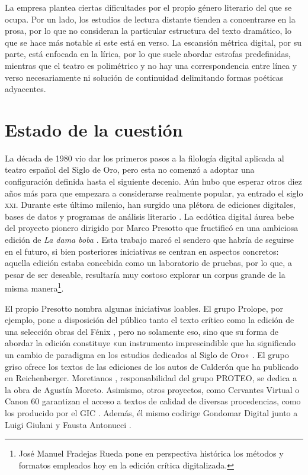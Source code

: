 La empresa plantea ciertas dificultades por el propio género literario del que se ocupa. Por un lado, los estudios de lectura distante tienden a concentrarse en la prosa, por lo que no consideran la particular estructura del texto dramático, lo que se hace más notable si este está en verso. La escansión métrica digital, por su parte, está enfocada en la lírica, por lo que suele abordar estrofas predefinidas, mientras que el teatro es polimétrico y no hay una correspondencia entre línea y verso necesariamente ni solución de continuidad delimitando formas poéticas adyacentes.

\section{Estado de la cuestión}
La década de 1980 vio dar los primeros pasos a la filología digital aplicada al teatro español del Siglo de Oro, pero esta no comenzó a adoptar una configuración definida hasta el siguiente decenio. Aún hubo que esperar otros diez años más para que empezara a considerarse realmente popular, ya entrado el siglo \textsc{xxi}. Durante este último milenio, han surgido una plétora de ediciones digitales, bases de datos y programas de análisis literario \parencite{kroll2019b}. La ecdótica digital áurea bebe del proyecto pionero dirigido por Marco Presotto que fructificó en una ambiciosa edición de \textit{La dama boba} \parencite{vega_boba}. Esta trabajo marcó el sendero que habría de seguirse en el futuro, si bien posteriores iniciativas se centran en aspectos concretos: aquella edición estaba concebida como un laboratorio de pruebas, por lo que, a pesar de ser deseable, resultaría muy costoso explorar un corpus grande de la misma manera\footnote{José Manuel Fradejas Rueda \parencite*{fradejas2022a} pone en perspectiva histórica los  métodos y formatos empleados hoy en la edición crítica digitalizada.}.

El propio Presotto \parencite*[32-36]{presotto2018} nombra algunas iniciativas loables. El grupo Prolope, por ejemplo, pone a disposición del público tanto el texto crítico como la edición de una selección obras del Fénix \parencite{prolope2023}, pero no solamente eso, sino que su forma de abordar la edición constituye «un instrumento  imprescindible  que  ha  significado  un cambio de paradigma en los estudios dedicados al Siglo de Oro» \parencite[2]{presotto2023}. El grupo \ac{griso} ofrece los textos de las ediciones de los autos de Calderón que ha publicado en Reichenberger.  Moretianos \parencite{moretianos2023}, responsabilidad del grupo PROTEO, se dedica a la obra de Agustín Moreto. Asimismo, otros proyectos, como Cervantes Virtual \parencite{cvc2021} o Canon 60 \parencite{tc12} garantizan el acceso a textos de calidad de diversas procedencias, como los producido por el GIC \parencite{gic2023}. Además, él mismo codirige Gondomar Digital junto a Luigi Giulani y Fausta Antonucci \parencite{gondomar}.

